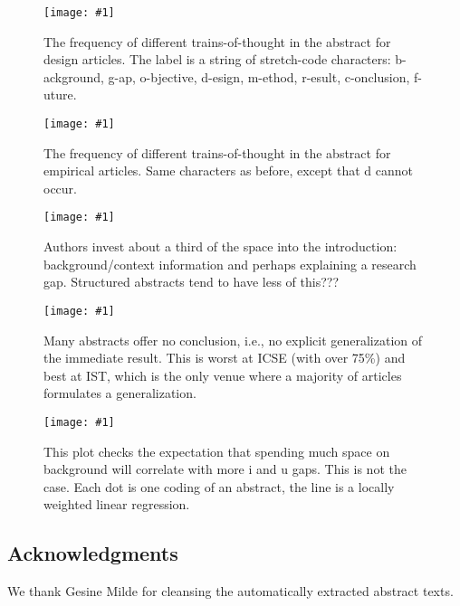 \documentclass[10pt,journal,compsoc]{IEEEtran}
\newcommand{\Plot}[2]{%
	\begin{figure}[!t]%
		\centering\texttt{[image: \#1]}%
		\vspace{-4mm}\caption{#2}\label{#1}%
	\end{figure}}
\begin{document}
\Plot{ab_topicstructure_freqs_design}{%
  The frequency of different trains-of-thought in the abstract for design articles.
  The label is a string of stretch-code characters:
  b-ackground, g-ap, o-bjective, d-esign, m-ethod, r-esult, c-onclusion, f-uture.}
\Plot{ab_topicstructure_freqs_empir}{%
	The frequency of different trains-of-thought in the abstract for empirical articles.
	Same characters as before, except that d cannot occur.}
\Plot{boxplots_fraction_introduction}{%
	Authors invest about a third of the space into the introduction:
	background/context information and perhaps explaining a research gap.
	Structured abstracts tend to have less of this???}
\Plot{boxplots_fraction_conclusion}{%
	Many abstracts offer no conclusion, i.e., no explicit generalization of the immediate result.
	This is worst at ICSE (with over 75\%)
	and best at IST, which is the only venue where a majority of articles formulates a generalization.}
\Plot{lowess_gaps_by_fracintro}{%
	This plot checks the expectation that spending much space on background
	will correlate with more i and u gaps.
	This is not the case.
	Each dot is one coding of an abstract, 
	the line is a locally weighted linear regression.}



\subsection{Acknowledgments}
\noindent We thank Gesine Milde for cleansing the automatically extracted abstract texts.




\end{document}
